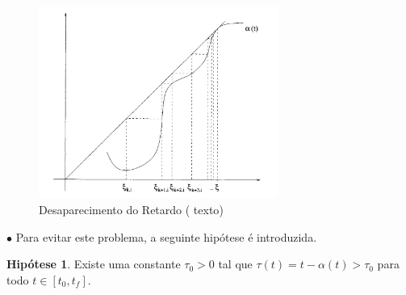 \documentclass{beamer}
\theoremstyle{plain}
\theoremstyle{definition}
\newtheorem{hip}{Hipótese}
\begin{document}
\begin{frame}%

    \small

    \begin{figure}
        \begin{center}
            \includegraphics[width=0.7\textwidth, height=0.5\textheight]{desaparecimento_do_retardo.png}
        \end{center}
        \caption{Desaparecimento do Retardo ({\color{red} texto})}\label{fig:Desaparecimento do Retardo}
    \end{figure}


    $\bullet$ Para evitar este problema, a seguinte hipótese é introduzida.

    \begin{hip}
        Existe uma constante $ \tau_0 > 0 $ tal que $ \tau(t) = t - \alpha(t) > \tau_0 $ para todo $ t \in [t_0, t_f] $.
        \label{H1:hipotese:hypothesis}
    \end{hip}




\end{frame}


%
%     
%
%         
%
\end{document}
